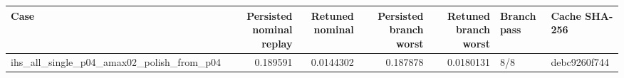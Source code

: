 \begin{tabular}{lrrrrll}
\toprule
Case & Persisted nominal replay & Retuned nominal & Persisted branch worst & Retuned branch worst & Branch pass & Cache SHA-256 \\
\midrule
ihs\_all\_single\_p04\_amax02\_polish\_from\_p04 & 0.189591 & 0.0144302 & 0.187878 & 0.0180131 & 8/8 & debc9260f744 \\
\bottomrule
\end{tabular}
